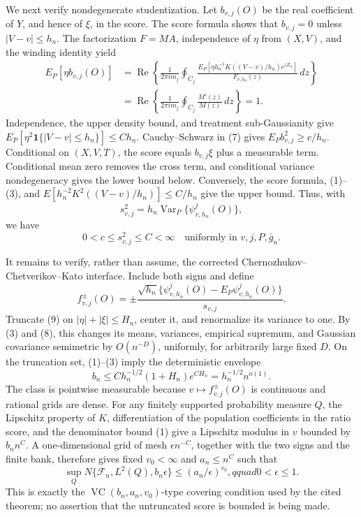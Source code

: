 We next verify nondegenerate studentization. Let \(b_{v,j}(O)\) be the real coefficient of \(Y\), and hence of \(\xi\), in the score. The score formula shows that \(b_{v,j}=0\) unless \(|V-v|\le h_n\). The factorization \(F=MA\), independence of \(\eta\) from \((X,V)\), and the winding identity yield
\[
 \begin{aligned}
 E_P[\eta b_{v,j}(O)]
 &=\operatorname{Re}\left\{\frac1{2\pi i m_j}\oint_{C_j}
 \frac{E_P[\eta h_n^{-1}K((V-v)/h_n)e^{zZ_n}]}{F_{v,h_n}(z)}\,dz\right\}\\
 &=\operatorname{Re}\left\{\frac1{2\pi i m_j}\oint_{C_j}\frac{M'(z)}{M(z)}\,dz\right\}=1. 
 \end{aligned} \tag{7}
\]
Independence, the upper density bound, and treatment sub-Gaussianity give \(E_P[\eta^2\mathbf 1\{|V-v|\le h_n\}]\le Ch_n\). Cauchy--Schwarz in (7) gives \(E_Pb_{v,j}^2\ge c/h_n\). Conditional on \((X,V,T)\), the score equals \(b_{v,j}\xi\) plus a measurable term. Conditional mean zero removes the cross term, and conditional variance nondegeneracy gives the lower bound below. Conversely, the score formula, (1)--(3), and \(E[h_n^{-2}K^2((V-v)/h_n)]\le C/h_n\) give the upper bound. Thus, with
\[
 s_{v,j}^2=h_n\operatorname{Var}_P\{\psi^j_{v,h_n}(O)\},
\]
we have
\[
 0<c\le s_{v,j}^2\le C<\infty \quad
 \text{uniformly in }v,j,P,\bar g_n. \tag{8}
\]

It remains to verify, rather than assume, the corrected Chernozhukov--Chetverikov--Kato interface. Include both signs and define
\[
 f_{v,j}^{\pm}(O)=\pm\frac{\sqrt{h_n}\{\psi^j_{v,h_n}(O)-E_P\psi^j_{v,h_n}(O)\}}{s_{v,j}}. \tag{9}
\]
Truncate (9) on \(|\eta|+|\xi|\le H_n\), center it, and renormalize its variance to one. By (3) and (8), this changes its means, variances, empirical supremum, and Gaussian covariance semimetric by \(O(n^{-D})\), uniformly, for arbitrarily large fixed \(D\). On the truncation set, (1)--(3) imply the deterministic envelope
\[
 b_n\le C h_n^{-1/2}(1+H_n)e^{C H_n}
 =h_n^{-1/2}n^{o(1)}. \tag{10}
\]
The class is pointwise measurable because \(v\mapsto f_{v,j}^{\pm}(O)\) is continuous and rational grids are dense. For any finitely supported probability measure \(Q\), the Lipschitz property of \(K\), differentiation of the population coefficients in the ratio score, and the denominator bound (1) give a Lipschitz modulus in \(v\) bounded by \(b_n n^C\). A one-dimensional grid of mesh \(\epsilon n^{-C}\), together with the two signs and the finite bank, therefore gives fixed \(v_0<\infty\) and \(a_n\le n^C\) such that
\[
 \sup_Q N\{\mathcal F_n,L^2(Q),b_n\epsilon\}
 \le(a_n/\epsilon)^{v_0},qquad 0<\epsilon\le1. \tag{11}
\]
This is exactly the \(\operatorname{VC}(b_n,a_n,v_0)\)-type covering condition used by the cited theorem; no assertion that the untruncated score is bounded is being made.

